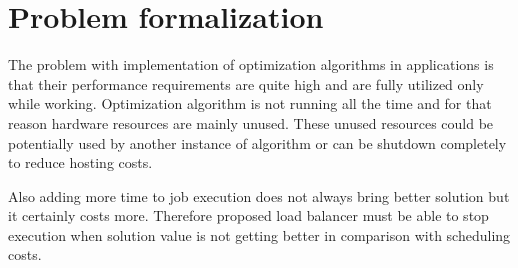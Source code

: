 \chapter{Problem formalization}\label{ch:problem-formalization}

The problem with implementation of optimization algorithms in applications is that their
performance requirements are quite high and are fully utilized only while working.
Optimization algorithm is not running all the time and for that reason hardware resources are mainly unused.
These unused resources could be potentially used by another instance of algorithm
or can be shutdown completely to reduce hosting costs.

Also adding more time to job execution does not always bring better solution
but it certainly costs more.
Therefore proposed load balancer must be able to stop execution when solution value
is not getting better in comparison with scheduling costs.



